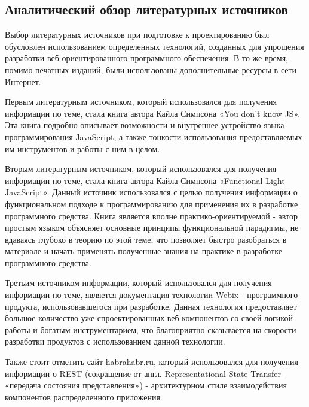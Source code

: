 \subsection{Аналитический обзор литературных источников}
\label{sec:analysis:literature}

Выбор литературных источников при подготовке к проектированию был обусловлен использованием определенных технологий, созданных для упрощения разработки веб-ориентированного программного обеспечения. В то же время, помимо печатных изданий, были использованы дополнительные ресурсы в сети Интернет.

Первым литературным источником, который использовался для получения информации по теме, стала книга автора Кайла Симпсона «You don’t know JS». Эта книга подробно описывает возможности и внутреннее устройство языка программирования JavaScript, а также тонкости использования предоставляемых им инструментов и работы с ним в целом. 

Вторым литературным источником, который использовался для получения информации по теме, стала книга автора Кайла Симпсона «Functional-Light JavaScript». Данный источник использовался с целью получения информации о функциональном подходе к программированию для применения их в разработке программного средства. Книга является вполне практико-ориентируемой - автор простым языком объясняет основные принципы функциональной парадигмы, не вдаваясь глубоко в теорию по этой теме, что позволяет быстро разобраться в материале и начать применять полученные знания на практике в разработке программного средства.

Третьим источником информации, который использовался для получения информации по теме, является документация технологии Webix - программного продукта, использовавшегося при разработке. Данная технология предоставляет большое количество уже спроектированных веб-компонентов со своей логикой работы и богатым инструментарием, что благоприятно сказывается на скорости разработки продуктов с использованием данной технологии.

Также стоит отметить сайт habrahabr.ru, который использовался для получения информации о REST (сокращение от англ. Representational State Transfer - «передача состояния представления») - архитектурном стиле взаимодействия компонентов распределенного приложения.
